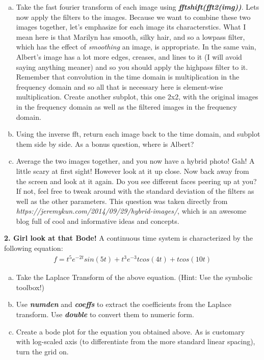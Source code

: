 \documentclass[11pt]{article}
\begin{document}
\begin{enumerate}[a.]
    \item Take the fast fourier transform of each image using
    \textit{\textbf{fftshift(fft2(img))}}.
    Lets now apply the filters to the images.
    Because we want to combine these two images together,
    let's emphasize for each image its characterstics.
    What I mean here is that Marilyn has smooth, silky hair,
    and so a lowpass filter, which has the effect of \textit{smoothing}
    an image, is appropriate.
    In the same vain, Albert's image has a lot more edges, creases, and lines to it 
    (I will avoid saying anything meaner) and so you should apply the highpass filter
    to it.
    Remember that convolution in the time domain is multiplication in the frequency domain
    and so all that is necessary here is element-wise multiplication.
    Create another subplot, this one 2x2, with the original images in the frequency domain
    as well as the filtered images in the frequency domain.

    \item Using the inverse fft,
    return each image back to the time domain, and subplot them side by side.
    As a bonus question, where is Albert?

    \item Average the two images together, and you now have a hybrid photo!
    Gah! A little scary at first sight!
    However look at it up close. Now back away from the screen and look at it again.
    Do you see different faces peering up at you?
    If not, feel free to tweak around with the standard deviation of the filters as 
    well as the other parameters.
    This question was taken directly from 
    \textit{https://jeremykun.com/2014/09/29/hybrid-images/},
    which is an awesome blog full of cool and informative ideas and concepts. 
\end{enumerate}


\noindent
\newline
\textbf{2. Girl look at that Bode!}
A continuous time system is characterized by the following equation:
\begin{align*}
    f=t^5e^{−2t}sin(5t) +t^3e^{−3}tcos(4t) +tcos(10t)
\end{align*}

\begin{enumerate}[a.]
    \item Take the Laplace Transform of the above equation. 
    (Hint: Use the symbolic toolbox!)
    
    \item Use \textbf{\textit{numden}} and \textbf{\textit{coeffs}}
    to extract the coefficients from the Laplace transform. 
    Use \textbf{\textit{double}} to convert them to numeric form.
    
    \item Create a bode plot for the equation you obtained above. 
    As is customary with log-scaled axis (to differentiate from the
    more standard linear spacing), turn the grid on.
\end{enumerate}
\end{document}

